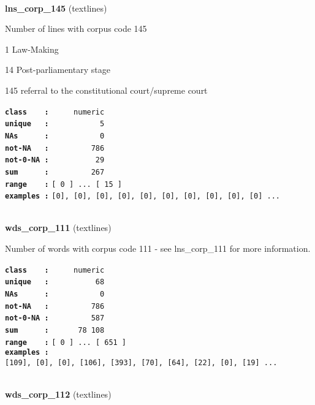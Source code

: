 \documentclass[]{article}
\begin{document}
~

\textbf{lns\_corp\_145} (textlines)

Number of lines with corpus code 145

1 Law-Making

14 Post-parliamentary stage

145 referral to the constitutional court/supreme court

\textbf{\texttt{class\ \ \ \ :}} \texttt{~~~~~numeric}\\
\textbf{\texttt{unique\ \ \ :}} \texttt{~~~~~~~~~~~5}\\
\textbf{\texttt{NAs\ \ \ \ \ \ :}} \texttt{~~~~~~~~~~~0}\\
\textbf{\texttt{not-NA\ \ \ :}} \texttt{~~~~~~~~~786}\\
\textbf{\texttt{not-0-NA\ :}} \texttt{~~~~~~~~~~29}\\
\textbf{\texttt{sum\ \ \ \ \ \ :}} \texttt{~~~~~~~~~267}\\
\textbf{\texttt{range\ \ \ \ :}}
\texttt{{[}\ 0\ {]}\ ...\ {[}\ 15\ {]}}\\
\textbf{\texttt{examples\ :}}
\texttt{{[}0{]},\ {[}0{]},\ {[}0{]},\ {[}0{]},\ {[}0{]},\ {[}0{]},\ {[}0{]},\ {[}0{]},\ {[}0{]},\ {[}0{]}\ ...}\\

~

\textbf{wds\_corp\_111} (textlines)

Number of words with corpus code 111 - see lns\_corp\_111 for more
information.

\textbf{\texttt{class\ \ \ \ :}} \texttt{~~~~~numeric}\\
\textbf{\texttt{unique\ \ \ :}} \texttt{~~~~~~~~~~68}\\
\textbf{\texttt{NAs\ \ \ \ \ \ :}} \texttt{~~~~~~~~~~~0}\\
\textbf{\texttt{not-NA\ \ \ :}} \texttt{~~~~~~~~~786}\\
\textbf{\texttt{not-0-NA\ :}} \texttt{~~~~~~~~~587}\\
\textbf{\texttt{sum\ \ \ \ \ \ :}} \texttt{~~~~~~78~108}\\
\textbf{\texttt{range\ \ \ \ :}}
\texttt{{[}\ 0\ {]}\ ...\ {[}\ 651\ {]}}\\
\textbf{\texttt{examples\ :}}
\texttt{{[}109{]},\ {[}0{]},\ {[}0{]},\ {[}106{]},\ {[}393{]},\ {[}70{]},\ {[}64{]},\ {[}22{]},\ {[}0{]},\ {[}19{]}\ ...}\\

~

\textbf{wds\_corp\_112} (textlines)
\end{document}
